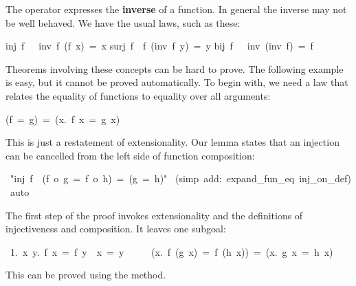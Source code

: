 The operator  expresses the 
\textbf{inverse}
of a function. In 
general the inverse may not be well behaved.  We have the usual laws,
such as these: 
\begin{isabelle}
inj\ f\ \ \isasymLongrightarrow\ inv\ f\ (f\ x)\ =\ x%
\isanewline
surj\ f\ \isasymLongrightarrow\ f\ (inv\ f\ y)\ =\ y
\isanewline
bij\ f\ \ \isasymLongrightarrow\ inv\ (inv\ f)\ =\ f
\end{isabelle}
%
%

Theorems involving these concepts can be hard to prove. The following 
example is easy, but it cannot be proved automatically. To begin 
with, we need a law that relates the equality of functions to 
equality over all arguments: 
\begin{isabelle}
(f\ =\ g)\ =\ ({\isasymforall}x.\ f\ x\ =\ g\ x)
\end{isabelle}
%
This is just a restatement of
extensionality.
Our lemma
states  that an injection can be cancelled from the left  side of
function composition: 
\begin{isabelle}
\ "inj\ f\ \isasymLongrightarrow\ (f\ o\ g\ =\ f\ o\ h)\ =\ (g\ =\ h)"\isanewline
{}\ (simp\ add:\ expand_fun_eq\ inj_on_def)\isanewline
{}\ auto\isanewline
{}
\end{isabelle}

The first step of the proof invokes extensionality and the definitions 
of injectiveness and composition. It leaves one subgoal:
\begin{isabelle}
\ 1.\ {\isasymforall}x\ y.\ f\ x\ =\ f\ y\ \isasymlongrightarrow\ x\ =\ y\
\isasymLongrightarrow\isanewline
\ \ \ \ ({\isasymforall}x.\ f\ (g\ x)\ =\ f\ (h\ x))\ =\ ({\isasymforall}x.\ g\ x\ =\ h\ x)
\end{isabelle}
This can be proved using the  method. 


